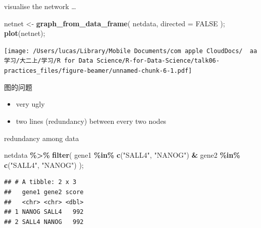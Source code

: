 \documentclass[ignorenonframetext,]{beamer}
\newenvironment{Shaded}{\begin{snugshade}}{\end{snugshade}}
\newcommand{\AttributeTok}[1]{\textcolor[rgb]{0.13,0.29,0.53}{#1}}
\newcommand{\ConstantTok}[1]{\textcolor[rgb]{0.56,0.35,0.01}{#1}}
\newcommand{\FunctionTok}[1]{\textcolor[rgb]{0.13,0.29,0.53}{\textbf{#1}}}
\newcommand{\NormalTok}[1]{#1}
\newcommand{\OtherTok}[1]{\textcolor[rgb]{0.56,0.35,0.01}{#1}}
\newcommand{\SpecialCharTok}[1]{\textcolor[rgb]{0.81,0.36,0.00}{\textbf{#1}}}
\newcommand{\StringTok}[1]{\textcolor[rgb]{0.31,0.60,0.02}{#1}}
\providecommand{\tightlist}{%
  \setlength{\itemsep}{0pt}\setlength{\parskip}{0pt}}
\newcommand\FontSmall{\fontsize{7}{8}\selectfont}
\begin{document}
\begin{frame}[fragile]{visualise the network \ldots{}}
\protect\hypertarget{visualise-the-network}{}
\FontSmall

\begin{Shaded}
\begin{Highlighting}[]
\NormalTok{netnet }\OtherTok{\textless{}{-}} \FunctionTok{graph\_from\_data\_frame}\NormalTok{( netdata, }\AttributeTok{directed =} \ConstantTok{FALSE}\NormalTok{ );}
\FunctionTok{plot}\NormalTok{(netnet);}
\end{Highlighting}
\end{Shaded}

\texttt{[image: /Users/lucas/Library/Mobile Documents/com~apple~CloudDocs/~~aa学习/大二上/学习/R for Data Science/R-for-Data-Science/talk06-practices\_files/figure-beamer/unnamed-chunk-6-1.pdf]}
\end{frame}

\begin{frame}{图的问题}
\protect\hypertarget{ux56feux7684ux95eeux9898}{}
\begin{itemize}
\tightlist
\item
  very ugly
\item
  two lines (redundancy) between every two nodes
\end{itemize}
\end{frame}

\begin{frame}[fragile]{redundancy among data}
\protect\hypertarget{redundancy-among-data}{}
\FontSmall

\begin{Shaded}
\begin{Highlighting}[]
\NormalTok{netdata }\SpecialCharTok{\%\textgreater{}\%} \FunctionTok{filter}\NormalTok{( gene1 }\SpecialCharTok{\%in\%} \FunctionTok{c}\NormalTok{(}\StringTok{"SALL4"}\NormalTok{, }\StringTok{"NANOG"}\NormalTok{) }\SpecialCharTok{\&}\NormalTok{ gene2 }\SpecialCharTok{\%in\%} \FunctionTok{c}\NormalTok{(}\StringTok{"SALL4"}\NormalTok{, }\StringTok{"NANOG"}\NormalTok{) );}
\end{Highlighting}
\end{Shaded}

\begin{verbatim}
## # A tibble: 2 x 3
##   gene1 gene2 score
##   <chr> <chr> <dbl>
## 1 NANOG SALL4   992
## 2 SALL4 NANOG   992
\end{verbatim}
\end{frame}
\end{document}
